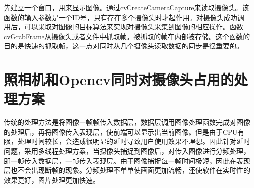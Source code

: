 \documentclass{XDBAthesis}
\begin{document}
先建立一个窗口，用来显示图像。通过cvCreateCameraCapture来读取摄像头。该函数的输入参数是一个ID号，只有存在多个摄像头时才起作用。对摄像头成功调用后，可以采取对图像的目标算法来实现对摄像头采集到图像的相应操作。函数cvGrabFrame从摄像头或者文件中抓取帧。被抓取的帧在内部被存储。这个函数的目的是快速的抓取帧，这一点对同时从几个摄像头读取数据的同步是很重要的。

\section{照相机和Opencv同时对摄像头占用的处理方案}

    传统的处理方法是将图像一帧帧传入数据层，数据层调用图像处理函数完成对图像的处理后，再将图像传入表现层，使前端可以显示出当前图像。但是由于CPU有限，处理时间较长，会造成很明显的延时导致用户使用效果不理想。因此针对延时问题，采用多线程处理方案，当摄像头捕捉到图像后，对传入图像进行分频处理，即一帧传入数据层，一帧传入表现层。由于图像捕捉每一帧时间极短，因此在表现层也不会出现断帧的现象。分频处理不单单使画面更加流畅，还使软件在实时性的效果更好，图片处理更加快速。



\ifx\allfiles\undefined
%

\end{document}
